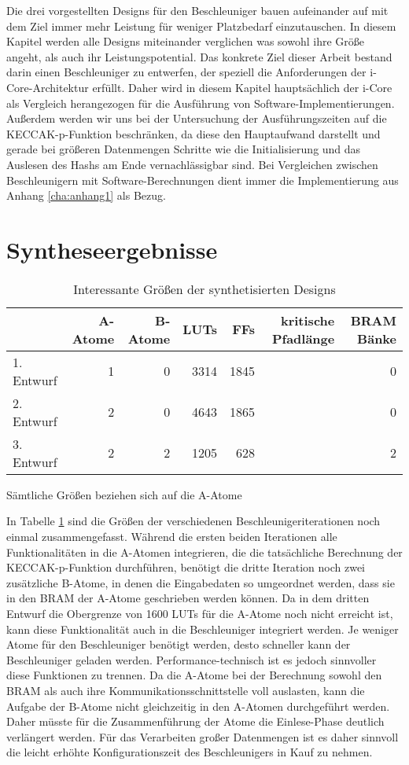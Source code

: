 Die drei vorgestellten Designs für den Beschleuniger bauen aufeinander auf mit dem Ziel immer mehr Leistung für weniger Platzbedarf einzutauschen.
In diesem Kapitel werden alle Designs miteinander verglichen was sowohl ihre Größe angeht, als auch ihr Leistungspotential.
Das konkrete Ziel dieser Arbeit bestand darin einen Beschleuniger zu entwerfen, der speziell die Anforderungen der i-Core-Architektur erfüllt.
Daher wird in diesem Kapitel hauptsächlich der i-Core als Vergleich herangezogen für die Ausführung von Software-Implementierungen.
Außerdem werden wir uns bei der Untersuchung der Ausführungszeiten auf die KECCAK-p-Funktion beschränken,
da diese den Hauptaufwand darstellt und gerade bei größeren Datenmengen Schritte wie die Initialisierung und das Auslesen des Hashs am Ende vernachlässigbar sind.
Bei Vergleichen zwischen Beschleunigern mit Software-Berechnungen dient immer die Implementierung aus Anhang \ref{cha:anhang1} als Bezug.

\section{Syntheseergebnisse}
\begin{table}
    \centering
    \begin{tabular}{lrrrrrr}
    & A-Atome & B-Atome & LUTs & FFs & kritische Pfadlänge & BRAM Bänke \\
    \hline
    1. Entwurf & 1 & 0 & 3314 & 1845 & \comment{?} & 0 \\
    2. Entwurf & 2 & 0 & 4643 & 1865 & \comment{?} & 0 \\
    3. Entwurf & 2 & 2 & 1205 & 628 & \comment{?} & 2
    \end{tabular}
    \label{tab:synth_ergebniss}
    \caption{Interessante Größen der synthetisierten Designs}
    \small
    Sämtliche Größen beziehen sich auf die A-Atome
\end{table}
In Tabelle \ref{tab:synth_ergebniss} sind die Größen der verschiedenen Beschleunigeriterationen noch einmal zusammengefasst.
Während die ersten beiden Iterationen alle Funktionalitäten in die A-Atomen integrieren, die die tatsächliche Berechnung der KECCAK-p-Funktion durchführen,
benötigt die dritte Iteration noch zwei zusätzliche B-Atome, in denen die Eingabedaten so umgeordnet werden, dass sie in den BRAM der A-Atome geschrieben werden können.
Da in dem dritten Entwurf die Obergrenze von 1600 LUTs für die A-Atome noch nicht erreicht ist, kann diese Funktionalität auch in die Beschleuniger integriert werden.
Je weniger Atome für den Beschleuniger benötigt werden, desto schneller kann der Beschleuniger geladen werden.
Performance-technisch ist es jedoch sinnvoller diese Funktionen zu trennen. Da die A-Atome bei der Berechnung sowohl den BRAM als auch ihre Kommunikationsschnittstelle
voll auslasten, kann die Aufgabe der B-Atome nicht gleichzeitig in den A-Atomen durchgeführt werden. Daher müsste für die Zusammenführung der Atome die Einlese-Phase deutlich verlängert werden.
Für das Verarbeiten großer Datenmengen ist es daher sinnvoll die leicht erhöhte Konfigurationszeit des Beschleunigers in Kauf zu nehmen.

